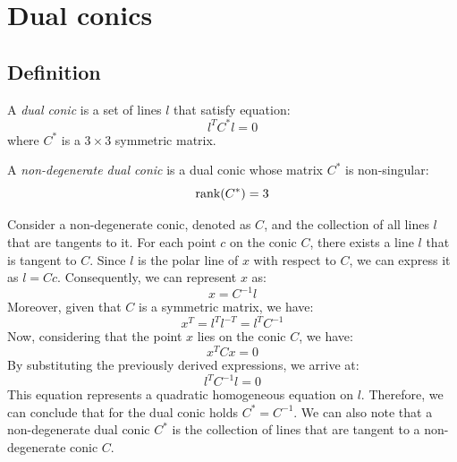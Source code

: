 \section{Dual conics}

\subsection{Definition}
\begin{definition}
    A \emph{dual conic} is a set of lines $l$ that satisfy equation:
    \[l^TC^{*}l=0\]
    where $C^{*}$ is a $3 \times 3$ symmetric matrix.

    A \emph{non-degenerate dual conic} is a dual conic whose matrix $C^{*}$ is non-singular: 
    \[\textnormal{rank}(C^{*})=3\]
\end{definition}
Consider a non-degenerate conic, denoted as $C$, and the collection of all lines $l$ that are tangents to it.
For each point $c$ on the conic $C$, there exists a line $l$ that is tangent to $C$. 
Since $l$ is the polar line of $x$ with respect to $C$, we can express it as $l=Cc$.
Consequently, we can represent $x$ as:
\[x=C^{-1}l\]
Moreover, given that $C$ is a symmetric matrix, we have:
\[x^T=l^Tl^{-T}=l^TC^{-1}\]
Now, considering that the point $x$ lies on the conic $C$, we have:
\[x^TCx=0\]
By substituting the previously derived expressions, we arrive at:
\[l^TC^{-1}l=0\]
This equation represents a quadratic homogeneous equation on $l$. 
Therefore, we can conclude that for the dual conic holds $C^{*}=C^{-1}$. 
We can also note that a non-degenerate dual conic $C^{*}$ is the collection of lines that are tangent to a non-degenerate conic $C$.

